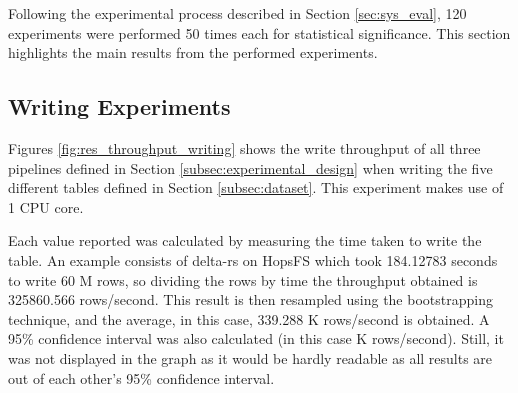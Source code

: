 Following the experimental process described in Section \ref{sec:sys_eval}, 120 experiments were performed 50 times each for statistical significance. This section highlights the main results from the performed experiments.

\subsection{Writing Experiments}

Figures \ref{fig:res_throughput_writing} shows the write throughput of all three pipelines defined in Section \ref{subsec:experimental_design} when writing the five different tables defined in Section \ref{subsec:dataset}. This experiment makes use of 1 \gls{CPU} core. 

Each value reported was calculated by measuring the time taken to write the table. An example consists of delta-rs on \gls{HopsFS} which took 184.12783 seconds to write 60 M rows, so dividing the rows by time the throughput obtained is 325860.566 rows/second. This result is then resampled using the bootstrapping technique, and the average, in this case, 339.288 K rows/second is obtained. A 95\% confidence interval was also calculated (in this case  K rows/second). Still, it was not displayed in the graph as it would be hardly readable as all results are out of each other's 95\% confidence interval.

